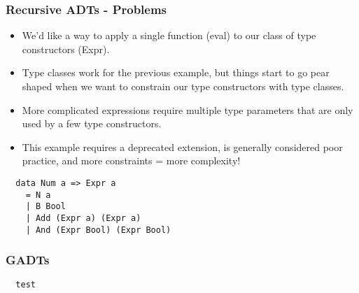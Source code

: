 \documentclass{beamer}
\begin{document}
\begin{frame}[fragile]
\frametitle{Recursive ADTs - Problems}
\begin{itemize}
\item We'd like a way to apply a single function (eval) to our class of type
  constructors (Expr).
\item Type classes work for the previous example, but things start to go pear
  shaped when we want to constrain our type constructors with type classes.
\item More complicated expressions require multiple type parameters that are
only used by a few type constructors.
\item This example requires a deprecated extension, is generally
considered poor practice, and more constraints = more complexity! \\
\end{itemize}
\begin{minipage}{1\textwidth}
  \begin{verbatim}
  data Num a => Expr a
    = N a
    | B Bool
    | Add (Expr a) (Expr a)
    | And (Expr Bool) (Expr Bool)
  \end{verbatim}
\end{minipage}
\end{frame}

\begin{frame}
\frametitle{GADTs}
\begin{minipage}{1\textwidth}

  \begin{verbatim}
  test
  \end{verbatim}

  \end{minipage}

\end{frame}
\end{document}
